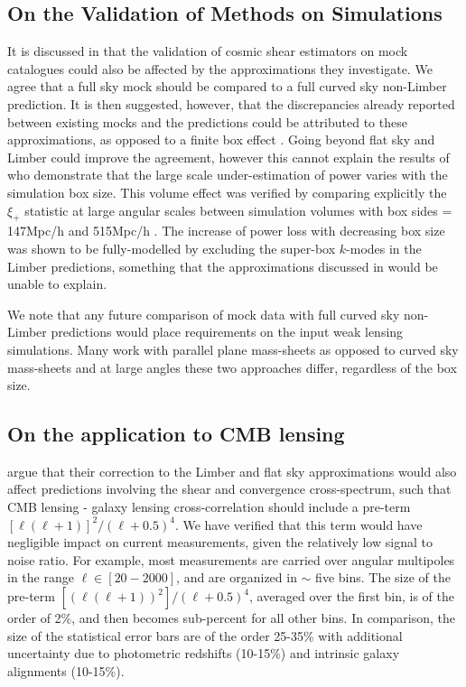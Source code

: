 \subsection{On the Validation of Methods on Simulations}
It is discussed in \citet{kitching/etal:2016} that the validation of cosmic shear estimators on mock catalogues could also be affected by the approximations they investigate.  We agree that a full sky mock should be compared to a full curved sky non-Limber prediction.  It is then suggested, however, that the discrepancies already reported between existing mocks and the predictions could be attributed to these approximations, as opposed to a finite box effect \citep{kiessling/etal:2011, harnois-deraps/etal:2012, harnois-deraps/vanwaerbeke:2015}.  Going beyond flat sky and Limber could improve the agreement, however this cannot explain the results of \citet{harnois-deraps/vanwaerbeke:2015} who demonstrate that the large scale under-estimation of power varies with the simulation box size. This volume effect was verified by comparing explicitly the $\xi_+$ statistic at large angular scales between simulation volumes with box sides = 147Mpc/h and 515Mpc/h \citep[see Fig. 5 in][]{harnois-deraps/vanwaerbeke:2015}. The increase of power loss with decreasing box size was shown to be fully-modelled by excluding the super-box $k$-modes in the Limber predictions, something that the approximations discussed in \citet{kitching/etal:2016} would be unable to explain.

We note that any future comparison of mock data with full curved sky non-Limber predictions would place requirements on the input weak lensing simulations.  Many work with parallel plane mass-sheets as opposed to curved sky mass-sheets and at large angles these two approaches differ, regardless of the box size. 

\subsection{On the application to CMB lensing}
\citet{kitching/etal:2016} argue that their correction to the Limber and flat sky approximations would also affect predictions involving the shear and convergence cross-spectrum, such that CMB lensing - galaxy lensing cross-correlation should include a pre-term $ [\ell(\ell+1)]^2/(\ell+ 0.5)^4$.   We have verified that this term would have negligible impact on current measurements, given the relatively low signal to noise ratio. For example, most measurements \citep{hand/etal:2015, liu/hill:2015, kirk/etal:2016,harnois-deraps/etal:2016} are carried over angular multipoles in the range $\ell \in [20-2000]$, and are organized in $\sim$ five bins. The size of the pre-term $ [(\ell(\ell+1))^2]/(\ell+ 0.5)^4$, averaged over the first bin, is of the order of 2\%, and then becomes sub-percent for all other bins. In comparison, the size of the statistical error bars are of the order 25-35\% with additional uncertainty due to photometric redshifts (10-15\%) and intrinsic galaxy alignments (10-15\%).





